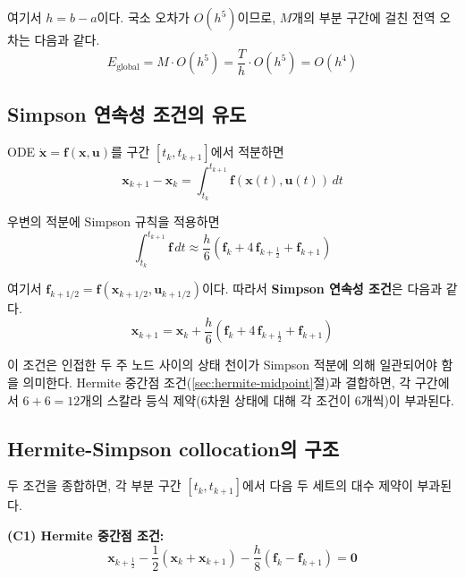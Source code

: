 \documentclass[11pt]{article}
\begin{document}
여기서 $h = b - a$이다. 국소 오차가 $O(h^5)$이므로, $M$개의 부분 구간에 걸친 전역 오차는 다음과 같다.
\[
E_{\text{global}} = M \cdot O(h^5) = \frac{T}{h} \cdot O(h^5) = O(h^4)
\]


\subsection{Simpson 연속성 조건의 유도}
\label{sec:simpson-continuity}

ODE $\dot{\mathbf{x}} = \mathbf{f}(\mathbf{x}, \mathbf{u})$를 구간 $[t_k, t_{k+1}]$에서 적분하면
\[
\mathbf{x}_{k+1} - \mathbf{x}_k = \int_{t_k}^{t_{k+1}} \mathbf{f}(\mathbf{x}(t), \mathbf{u}(t))\, dt
\]

우변의 적분에 Simpson 규칙을 적용하면
\[
\int_{t_k}^{t_{k+1}} \mathbf{f}\, dt \approx \frac{h}{6} \left( \mathbf{f}_k + 4\, \mathbf{f}_{k+\frac{1}{2}} + \mathbf{f}_{k+1} \right)
\]

여기서 $\mathbf{f}_{k+1/2} = \mathbf{f}(\mathbf{x}_{k+1/2}, \mathbf{u}_{k+1/2})$이다. 따라서 \textbf{Simpson 연속성 조건}은 다음과 같다.
\begin{equation}
\label{eq:simpson-continuity}
\mathbf{x}_{k+1} = \mathbf{x}_k + \frac{h}{6}\left(\mathbf{f}_k + 4\, \mathbf{f}_{k+\frac{1}{2}} + \mathbf{f}_{k+1}\right)
\end{equation}

이 조건은 인접한 두 주 노드 사이의 상태 천이가 Simpson 적분에 의해 일관되어야 함을 의미한다. Hermite 중간점 조건(\ref{sec:hermite-midpoint}절)과 결합하면, 각 구간에서 $6 + 6 = 12$개의 스칼라 등식 제약(6차원 상태에 대해 각 조건이 6개씩)이 부과된다.


\subsection{Hermite-Simpson collocation의 구조}
\label{sec:hs-structure}

두 조건을 종합하면, 각 부분 구간 $[t_k, t_{k+1}]$에서 다음 두 세트의 대수 제약이 부과된다.

\textbf{(C1) Hermite 중간점 조건:}
\begin{equation}
\label{eq:C1}
\mathbf{x}_{k+\frac{1}{2}} - \frac{1}{2}(\mathbf{x}_k + \mathbf{x}_{k+1}) - \frac{h}{8}(\mathbf{f}_k - \mathbf{f}_{k+1}) = \mathbf{0}
\end{equation}
\end{document}
